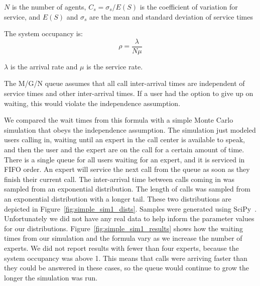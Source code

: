 $N$ is the number of agents,
$C_s = \sigma_s / E(S)$ is the coefficient of variation for service, and
$E(S)$ and $\sigma_s$ are the mean and standard deviation of service times

The system occupancy is:
\[
\rho = \frac{\lambda}{N \mu}
\]

$\lambda$ is the arrival rate and $\mu$ is the service rate.

The M/G/N queue assumes that all call inter-arrival times are independent of
service times and other inter-arrival times.
If a user had the option to give up on waiting, this would violate the
independence assumption.

We compared the wait times from this formula with a simple Monte Carlo
simulation that obeys the independence assumption.
The simulation just modeled users calling in, waiting until an expert in the
call center is available to speak, and then the user and the expert are on the
call for a certain amount of time.
There is a single queue for all users waiting for an expert, and it is serviced
in FIFO order.
An expert will service the next call from the queue as soon as they finish their
current call.
The inter-arrival time between calls coming in was sampled from an exponential
distribution.
The length of calls was sampled from an exponential distribution with a longer
tail.
These two distributions are depicted in Figure~\ref{fig:simple_sim1_dists}.
Samples were generated using SciPy~\cite{scipy}.
Unfortunately we did not have any real data to help inform the parameter values
for our distributions.
Figure~\ref{fig:simple_sim1_results} shows how the waiting times from our
simulation and the formula vary as we increase the number of experts.
We did not report results with fewer than four experts, because the system
occupancy was above 1.
This means that calls were arriving faster than they could be answered in these
cases, so the queue would continue to grow the longer the simulation was run.

